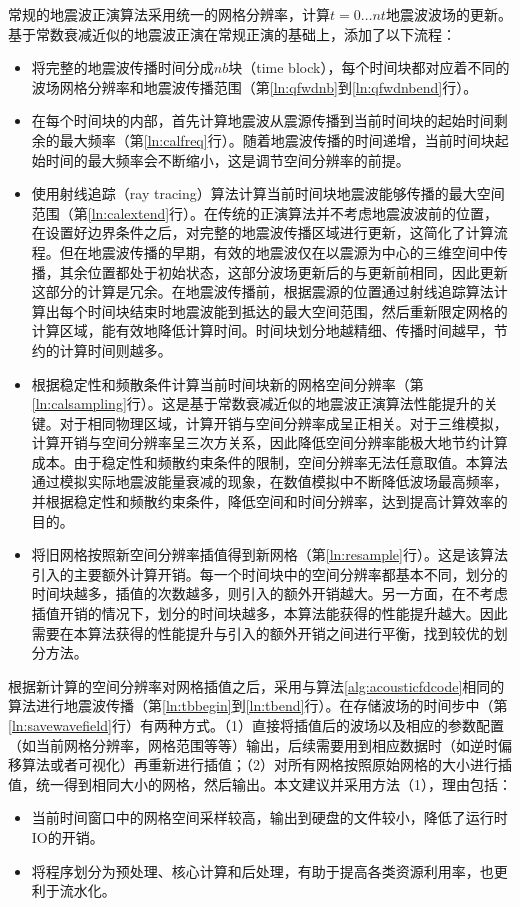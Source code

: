 \documentclass[degree=doctor]{thuthesis}
\begin{document}
常规的地震波正演算法采用统一的网格分辨率，计算$t=0\ldots nt$地震波波场的更新。基于常数衰减近似的地震波正演在常规正演的基础上，添加了以下流程：
\begin{itemize}
  \item 将完整的地震波传播时间分成$nb$块（time block），每个时间块都对应着不同的波场网格分辨率和地震波传播范围（第\ref{ln:qfwdnb}到\ref{ln:qfwdnbend}行）。
  \item 在每个时间块的内部，首先计算地震波从震源传播到当前时间块的起始时间剩余的最大频率（第\ref{ln:calfreq}行）。随着地震波传播的时间递增，当前时间块起始时间的最大频率会不断缩小，这是调节空间分辨率的前提。
  \item 使用射线追踪（ray tracing）算法\cite{um1987fast}计算当前时间块地震波能够传播的最大空间范围（第\ref{ln:calextend}行）。在传统的正演算法并不考虑地震波波前的位置，在设置好边界条件之后，对完整的地震波传播区域进行更新，这简化了计算流程。但在地震波传播的早期，有效的地震波仅在以震源为中心的三维空间中传播，其余位置都处于初始状态，这部分波场更新后的与更新前相同，因此更新这部分的计算是冗余。在地震波传播前，根据震源的位置通过射线追踪算法计算出每个时间块结束时地震波能到抵达的最大空间范围，然后重新限定网格的计算区域，能有效地降低计算时间。时间块划分地越精细、传播时间越早，节约的计算时间则越多。
  \item 根据稳定性和频散条件计算当前时间块新的网格空间分辨率（第\ref{ln:calsampling}行）。这是基于常数衰减近似的地震波正演算法性能提升的关键。对于相同物理区域，计算开销与空间分辨率成呈正相关。对于三维模拟，计算开销与空间分辨率呈三次方关系，因此降低空间分辨率能极大地节约计算成本。由于稳定性和频散约束条件的限制，空间分辨率无法任意取值。本算法通过模拟实际地震波能量衰减的现象，在数值模拟中不断降低波场最高频率，并根据稳定性和频散约束条件，降低空间和时间分辨率，达到提高计算效率的目的。
  \item 将旧网格按照新空间分辨率插值得到新网格（第\ref{ln:resample}行）。这是该算法引入的主要额外计算开销。每一个时间块中的空间分辨率都基本不同，划分的时间块越多，插值的次数越多，则引入的额外开销越大。另一方面，在不考虑插值开销的情况下，划分的时间块越多，本算法能获得的性能提升越大。因此需要在本算法获得的性能提升与引入的额外开销之间进行平衡，找到较优的划分方法。
\end{itemize}

根据新计算的空间分辨率对网格插值之后，采用与算法\ref{alg:acousticfdcode}相同的算法进行地震波传播（第\ref{ln:tbbegin}到\ref{ln:tbend}行）。在存储波场的时间步中（第\ref{ln:savewavefield}行）有两种方式。（1）直接将插值后的波场以及相应的参数配置（如当前网格分辨率，网格范围等等）输出，后续需要用到相应数据时（如逆时偏移算法或者可视化）再重新进行插值；（2）对所有网格按照原始网格的大小进行插值，统一得到相同大小的网格，然后输出。本文建议并采用方法（1），理由包括：
\begin{itemize}
  \item 当前时间窗口中的网格空间采样较高，输出到硬盘的文件较小，降低了运行时IO的开销。
  \item 将程序划分为预处理、核心计算和后处理，有助于提高各类资源利用率，也更利于流水化。
\end{itemize}
\end{document}
